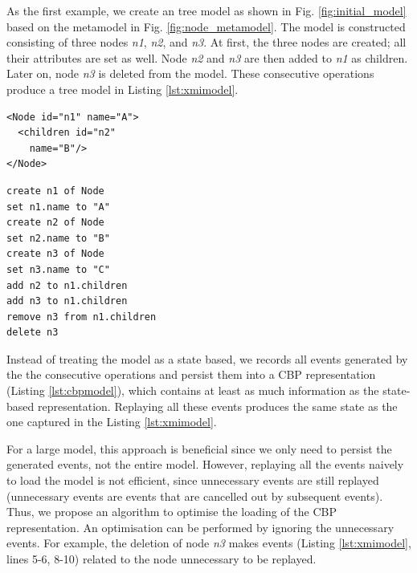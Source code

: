 \documentclass{llncs}
\begin{document}
As the first example, we create an tree model as shown in Fig. \ref{fig:initial_model} based on the metamodel in Fig. \ref{fig:node_metamodel}. The model is constructed consisting of three nodes \emph{n1}, \emph{n2}, and \emph{n3}. At first, the three nodes are created; all their attributes are set as well. Node \emph{n2} and \emph{n3} are then added to \emph{n1} as children. Later on, node \emph{n3} is deleted from the model. These consecutive operations produce a tree model in Listing \ref{lst:xmimodel}.

\noindent
\begin{minipage}[t]{0.34\linewidth}
\begin{lstlisting}[style=xmi,caption={State-based representation of the model in Figure \ref{fig:initial_model} after removal of node \emph{n3} in (simplified) XMI.},label=lst:xmimodel]
<Node id="n1" name="A">
  <children id="n2" 
    name="B"/>
</Node>
\end{lstlisting}
\end{minipage}
\hfill
\begin{minipage}[t]{0.635\linewidth}
\begin{lstlisting}[style=eol,caption={Change-based representation of the model in Figure \ref{fig:initial_model} after removal of node \emph{n3}.},label=lst:cbpmodel]
create n1 of Node
set n1.name to "A"      
create n2 of Node
set n2.name to "B"      
create n3 of Node
set n3.name to "C"      
add n2 to n1.children   
add n3 to n1.children   
remove n3 from n1.children 
delete n3
\end{lstlisting}
\end{minipage}

Instead of treating the model as a state based, we records all events generated by the the consecutive  operations and persist them into a CBP representation (Listing \ref{lst:cbpmodel}), which contains at least as much information as the state-based representation. Replaying all these events produces the same state as the one captured in the Listing \ref{lst:xmimodel}.  

For a large model, this approach is beneficial since we only need to persist the generated events, not the entire model. However, replaying all the events naively to load the model is not efficient, since unnecessary events are still replayed (unnecessary events are events that are cancelled out by subsequent events). Thus, we propose an algorithm to optimise the loading of the CBP representation. An optimisation can be performed by ignoring the unnecessary events. For example, the deletion of node \emph{n3} makes events (Listing \ref{lst:xmimodel}, lines 5-6, 8-10) related to the node unnecessary to be replayed. 
\end{document}
